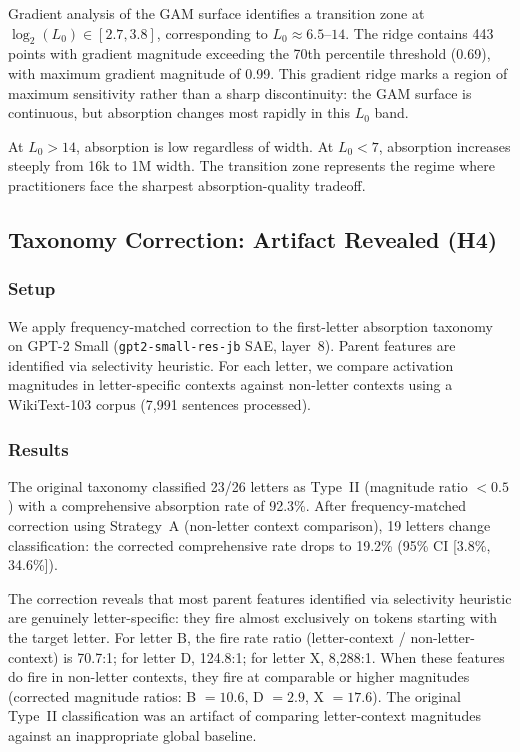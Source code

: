 \documentclass{article}
\begin{document}
Gradient analysis of the GAM surface identifies a transition zone at $\log_2(L_0) \in [2.7, 3.8]$, corresponding to $L_0 \approx 6.5$--$14$.
The ridge contains 443 points with gradient magnitude exceeding the 70th percentile threshold (0.69), with maximum gradient magnitude of 0.99.
This gradient ridge marks a region of maximum sensitivity rather than a sharp discontinuity: the GAM surface is continuous, but absorption changes most rapidly in this $L_0$ band.

At $L_0 > 14$, absorption is low regardless of width.
At $L_0 < 7$, absorption increases steeply from 16k to 1M width.
The transition zone represents the regime where practitioners face the sharpest absorption-quality tradeoff.

\subsection{Taxonomy Correction: Artifact Revealed (H4)}

\subsubsection{Setup}

We apply frequency-matched correction to the first-letter absorption taxonomy on GPT-2 Small (\texttt{gpt2-small-res-jb} SAE, layer~8).
Parent features are identified via selectivity heuristic.
For each letter, we compare activation magnitudes in letter-specific contexts against non-letter contexts using a WikiText-103 corpus (7,991 sentences processed).

\subsubsection{Results}

The original taxonomy classified 23/26 letters as Type~II (magnitude ratio $< 0.5$) with a comprehensive absorption rate of 92.3\%.
After frequency-matched correction using Strategy~A (non-letter context comparison), 19 letters change classification: the corrected comprehensive rate drops to 19.2\% (95\% CI [3.8\%, 34.6\%]).

The correction reveals that most parent features identified via selectivity heuristic are genuinely letter-specific: they fire almost exclusively on tokens starting with the target letter.
For letter B, the fire rate ratio (letter-context / non-letter-context) is 70.7:1; for letter D, 124.8:1; for letter X, 8,288:1.
When these features do fire in non-letter contexts, they fire at comparable or higher magnitudes (corrected magnitude ratios: B $= 10.6$, D $= 2.9$, X $= 17.6$).
The original Type~II classification was an artifact of comparing letter-context magnitudes against an inappropriate global baseline.
\end{document}
